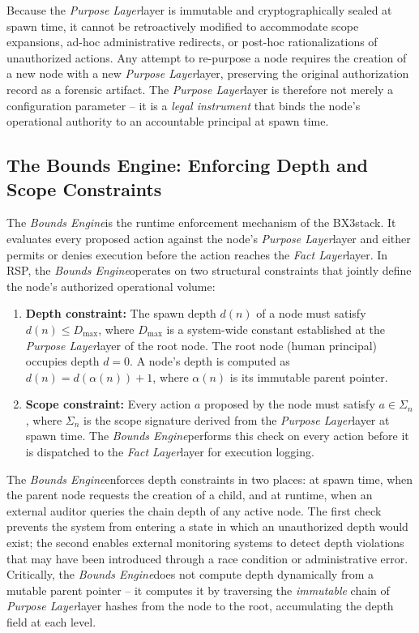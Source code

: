 \documentclass[12pt]{article}
\def\bxthree{BX3}
\def\purpose{\textit{Purpose Layer}}
\def\bounds{\textit{Bounds Engine}}
\def\fact{\textit{Fact Layer}}
\begin{document}
Because the \purpose layer is immutable and cryptographically sealed at spawn time, it cannot be retroactively modified to accommodate scope expansions, ad-hoc administrative redirects, or post-hoc rationalizations of unauthorized actions. Any attempt to re-purpose a node requires the creation of a new node with a new \purpose layer, preserving the original authorization record as a forensic artifact. The \purpose layer is therefore not merely a configuration parameter -- it is a \emph{legal instrument} that binds the node's operational authority to an accountable principal at spawn time.

\subsection{The Bounds Engine: Enforcing Depth and Scope Constraints}

The \bounds is the runtime enforcement mechanism of the \bxthree stack. It evaluates every proposed action against the node's \purpose layer and either permits or denies execution before the action reaches the \fact layer. In RSP, the \bounds operates on two structural constraints that jointly define the node's authorized operational volume:

\begin{enumerate}
    \item \textbf{Depth constraint:} The spawn depth $d(n)$ of a node must satisfy $d(n) \leq D_{\max}$, where $D_{\max}$ is a system-wide constant established at the \purpose layer of the root node. The root node (human principal) occupies depth $d = 0$. A node's depth is computed as $d(n) = d(\alpha(n)) + 1$, where $\alpha(n)$ is its immutable parent pointer.
    \item \textbf{Scope constraint:} Every action $a$ proposed by the node must satisfy $a \in \Sigma_n$, where $\Sigma_n$ is the scope signature derived from the \purpose layer at spawn time. The \bounds performs this check on every action before it is dispatched to the \fact layer for execution logging.
\end{enumerate}

The \bounds enforces depth constraints in two places: at spawn time, when the parent node requests the creation of a child, and at runtime, when an external auditor queries the chain depth of any active node. The first check prevents the system from entering a state in which an unauthorized depth would exist; the second enables external monitoring systems to detect depth violations that may have been introduced through a race condition or administrative error. Critically, the \bounds does not compute depth dynamically from a mutable parent pointer -- it computes it by traversing the \emph{immutable} chain of \purpose layer hashes from the node to the root, accumulating the depth field at each level.
\end{document}
